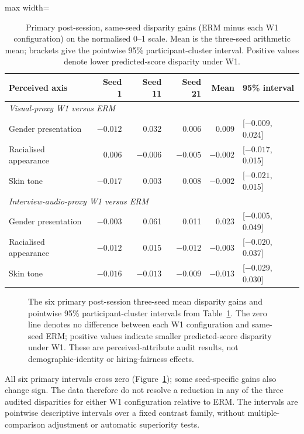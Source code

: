 \begin{table}[htbp]
\centering
\caption{Primary post-session, same-seed disparity gains (ERM minus each W1 configuration)
on the normalised 0--1 scale. Mean is the three-seed arithmetic mean; brackets give the
pointwise 95\% participant-cluster interval. Positive values denote lower predicted-score
disparity under W1.}
\label{tab:stage-c-disparity-contrasts}
\small
\begin{adjustbox}{max width=\textwidth}
\begin{tabular}{lrrrrl}
\toprule
Perceived axis & Seed 1 & Seed 11 & Seed 21 & Mean & 95\% interval \\
\midrule
\multicolumn{6}{l}{\textit{Visual-proxy W1 versus ERM}} \\
Gender presentation & $-0.012$ & 0.032 & 0.006 & 0.009 & [$-0.009$, 0.024] \\
Racialised appearance & 0.006 & $-0.006$ & $-0.005$ & $-0.002$ & [$-0.017$, 0.015] \\
Skin tone & $-0.017$ & 0.003 & 0.008 & $-0.002$ & [$-0.021$, 0.015] \\
\midrule
\multicolumn{6}{l}{\textit{Interview-audio-proxy W1 versus ERM}} \\
Gender presentation & $-0.003$ & 0.061 & 0.011 & 0.023 & [$-0.005$, 0.049] \\
Racialised appearance & $-0.012$ & 0.015 & $-0.012$ & $-0.003$ & [$-0.020$, 0.037] \\
Skin tone & $-0.016$ & $-0.013$ & $-0.009$ & $-0.013$ & [$-0.029$, 0.030] \\
\bottomrule
\end{tabular}
\end{adjustbox}
\end{table}

\begin{figure}[H]
\centering

\caption{The six primary post-session three-seed mean disparity gains and pointwise 95\%
participant-cluster intervals from Table~\ref{tab:stage-c-disparity-contrasts}. The zero line
denotes no difference between each W1 configuration and same-seed ERM; positive values indicate
smaller predicted-score disparity under W1. These are perceived-attribute audit results, not
demographic-identity or hiring-fairness effects.}
\label{fig:stage-c-primary-disparity}
\end{figure}
\FloatBarrier

All six primary intervals cross zero (Figure~\ref{fig:stage-c-primary-disparity}); some
seed-specific gains also change sign. The data therefore do not resolve a reduction in any of
the three audited disparities for either W1 configuration relative to ERM. The intervals are
pointwise descriptive intervals over a fixed contrast family, without multiple-comparison
adjustment or automatic superiority tests.

